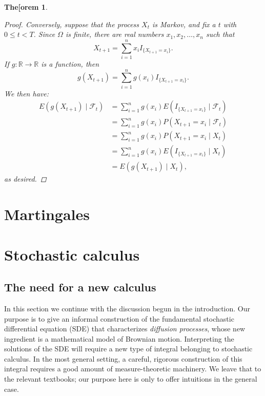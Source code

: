 \documentclass[11pt]{book}
\newtheorem{thm}{The[orem}[section]
\theoremstyle{definition}
\numberwithin{equation}{section}
\begin{document}
\begin{thm}
\begin{proof}
		Conversely, suppose that the process $X_t$ is Markov, and fix a $t$ with $0 \leq t < T$. Since $\Omega$ is finite, there are real numbers $x_1,x_2,\ldots,x_n$ such that
		\[
			X_{t+1} = \sum_{i=1}^n x_i I_{\{X_{t+1} = x_i \}}.
		\]
		If $g: \mathbb{R} \to \mathbb{R}$ is a function, then
		\[
			g(X_{t+1}) = \sum_{i=1}^n g(x_i) I_{\{X_{t+1} = x_i \}}.
		\]
		We then have:
		\begin{align*}
			E \left( g(X_{t+1}) \mid \mathcal{F}_t \right) & = \sum_{i=1}^n g(x_i) E\left(I_{\{X_{t+1} = x_i \}} \mid \mathcal{F}_t \right) \\
			                                               & = \sum_{i=1}^n g(x_i) P\left(X_{t+1} = x_i \mid \mathcal{F}_t \right)          \\
			                                               & = \sum_{i=1}^n g(x_i) P\left(X_{t+1} = x_i \mid X_t \right)                    \\
			                                               & = \sum_{i=1}^n g(x_i) E\left(I_{\{X_{t+1} = x_i \}} \mid X_t \right)           \\
			                                               & = E\left( g(X_{t+1}) \mid X_t \right),
		\end{align*}
		as desired.
	\end{proof}
\end{thm}

\section{Martingales}

\section{Stochastic calculus}

\subsection{The need for a new calculus}

In this section we continue with the discussion begun in the introduction. Our purpose is to give an informal construction of the fundamental stochastic differential equation (SDE) that characterizes \textit{diffusion processes}, whose new ingredient is a mathematical model of Brownian motion. Interpreting the solutions of the SDE will require a new type of integral belonging to stochastic calculus. In the most general setting, a careful, rigorous construction of this integral requires a good amount of measure-theoretic machinery. We leave that to the relevant textbooks; our purpose here is only to offer intuitions in the general case.
\end{document}
